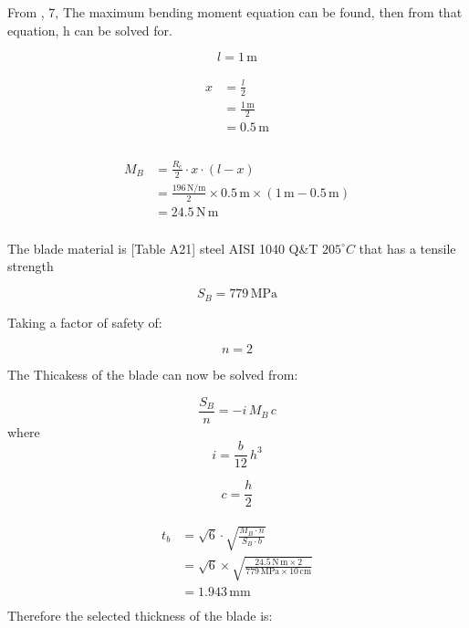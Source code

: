 \documentclass{article}
\begin{document}
From \cite[Table A-9]{shigley}, 7, The maximum bending moment equation can be found, then from that equation, h can be solved for.

\begin{equation}
l	= 1\,\mathrm{m}
\end{equation}

\begin{align}
\begin{split}
x	&= \frac{l}{2}\\
	&= \frac{1\,\mathrm{m}}{2}\\
	&= 0.5\,\mathrm{m}\\
\end{split}
\end{align}

\begin{align}
\begin{split}
M_{B}	&= \frac{R_{c}}{2} \cdot x \cdot \left(l - x\right)\\
		&= \frac{196\,\mathrm{{N}\slash{m}}}{2} \times 0.5\,\mathrm{m} \times \left(1\,\mathrm{m} - 0.5\,\mathrm{m}\right)\\
		&= 24.5\,\mathrm{N \, m}\\
\end{split}
\end{align}

The blade material is [Table A21] steel AISI 1040 Q\&T $205^\circ C$ that has a tensile strength

\begin{equation}
S_{B}	= 779\,\mathrm{MPa}
\end{equation}

Taking a factor of safety of:

\begin{equation}
n	= 2
\end{equation}

The Thicakess of the blade can now be solved from:

\begin{equation}
\frac{S_{B}}{n}=- i \, M_{B} \, c
\end{equation}
where
\begin{equation}
i=\frac{b}{12} \, h^{3}
\end{equation}

\begin{equation}
c=\frac{h}{2}
\end{equation}

\begin{align}
\begin{split}
t_{b}	&= \sqrt{6} \cdot \sqrt{\frac{M_{B} \cdot n}{S_{B} \cdot b}}\\
		&= \sqrt{6} \times \sqrt{\frac{24.5\,\mathrm{N \, m} \times 2}{779\,\mathrm{MPa} \times 10\,\mathrm{cm}}}\\
		&= 1.943\,\mathrm{mm}\\
\end{split}
\end{align}
Therefore the selected thickness of the blade is:
\end{document}
